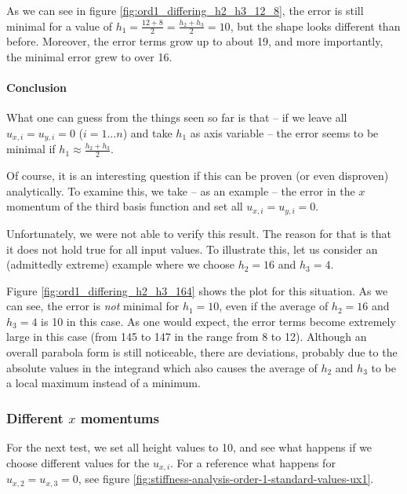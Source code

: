 \documentclass{article}
\begin{document}


As we can see in figure \ref{fig:ord1_differing_h2_h3_12_8}, the error is still minimal for a value of $h_1=\frac{12+8}{2}=\frac{h_2+h_3}{2}=10$, but the shape looks different than before. Moreover, the error terms grow up to about 19, and more importantly, the minimal error grew to over 16.

\paragraph{Conclusion}

What one can guess from the things seen so far is that -- if we leave all $u_{x,i}=u_{y,i}=0$ ($i=1\dots n$) and take $h_1$ as axis variable -- the error seems to be minimal if $h_1\approx \frac{h_2+h_3}{2}$.

Of course, it is an interesting question if this can be proven (or even disproven) analytically. To examine this, we take -- as an example -- the error in the $x$ momentum of the third basis function and set all $u_{x,i}=u_{y,i}=0$.

Unfortunately, we were not able to verify this result. The reason for that is that it does not hold true for all input values. To illustrate this, let us consider an (admittedly extreme) example where we choose $h_2=16$ and $h_3=4$.



Figure \ref{fig:ord1_differing_h2_h3_164} shows the plot for this situation. As we can see, the error is \emph{not} minimal for $h_1=10$, even if the average of $h_2=16$ and $h_3=4$ is 10 in this case. As one would expect, the error terms become extremely large in this case (from 145 to 147 in the range from 8 to 12). Although an overall parabola form is still noticeable, there are deviations, probably due to the absolute values in the integrand which also causes the average of $h_2$ and $h_3$ to be a local maximum instead of a minimum.

\subsubsection{\texorpdfstring{Different $x$ momentums}{Different x momentums}}
\label{sec:stiffness-analysis-ord1-nonstandard-diff-ux}

For the next test, we set all height values to 10, and see what happens if we choose different values for the $u_{x,i}$. For a reference what happens for $u_{x,2}=u_{x,3}=0$, see figure \ref{fig:stiffness-analysis-order-1-standard-values-ux1}.
\end{document}
